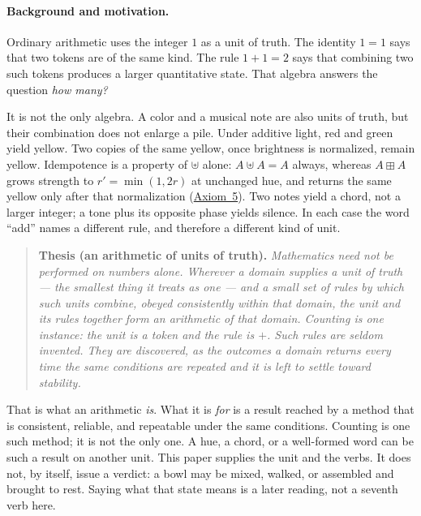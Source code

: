 \documentclass[12pt, a4paper]{article}
\begin{document}
\paragraph{Background and motivation.}
Ordinary arithmetic uses the integer $1$ as a unit of truth.
The identity $1=1$ says that two tokens are of the same kind.
The rule $1+1=2$ says that combining two such tokens produces a
larger quantitative state. That algebra answers the question
\emph{how many?}

It is not the only algebra. A color and a musical note are also
units of truth, but their combination does not enlarge a pile.
Under additive light, red and green yield yellow. Two copies of
the same yellow, once brightness is normalized, remain yellow.
Idempotence is a property of $\uplus$ alone: $A\uplus A=A$ always,
whereas $A\boxplus A$ grows strength to $r'=\min(1,2r)$ at unchanged
hue, and returns the same yellow only after that normalization
(\hyperref[subsec:axiom_interference]{Axiom~5}).
Two notes yield a chord, not a larger integer; a tone plus its
opposite phase yields silence. In each case the word ``add''
names a different rule, and therefore a different kind of unit.

\begin{quote}
\textbf{Thesis (an arithmetic of units of truth).}
\emph{Mathematics need not be performed on numbers alone. Wherever a
domain supplies a unit of truth --- the smallest thing it treats as
one --- and a small set of rules by which such units combine, obeyed
consistently within that domain, the unit and its rules together form
an arithmetic of that domain. Counting is one instance: the unit is a
token and the rule is $+$. Such rules are seldom invented. They are
discovered, as the outcomes a domain returns every time the same
conditions are repeated and it is left to settle toward stability.}
\end{quote}

That is what an arithmetic \emph{is}. What it is \emph{for} is a
result reached by a method that is consistent, reliable, and
repeatable under the same conditions. Counting is one such method; it
is not the only one. A hue, a chord, or a well-formed word can be
such a result on another unit. This paper supplies the unit and the
verbs. It does not, by itself, issue a verdict: a bowl may be mixed,
walked, or assembled and brought to rest. Saying what that state
means is a later reading, not a seventh verb here.
\end{document}

